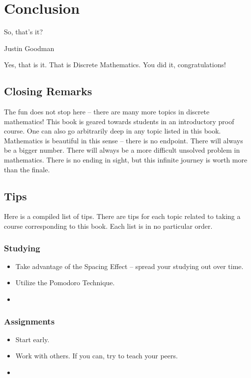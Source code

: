 \documentclass[main.tex]{subfiles}
\begin{document}
\chapter{Conclusion}

\epigraph{So, that's it?}{Justin Goodman}

Yes, that is it. That is Discrete Mathematics. You did it, congratulations!

\section{Closing Remarks}

The fun does not stop here -- there are many more topics in discrete mathematics! This book is geared towards students in an introductory proof course. One can also go arbitrarily deep in any topic listed in this book. Mathematics is beautiful in this sense -- there is no endpoint. There will always be a bigger number. There will always be a more difficult unsolved problem in mathematics. There is no ending in sight, but this infinite journey is worth more than the finale.

\section{Tips}

Here is a compiled list of tips. There are tips for each topic related to taking a course corresponding to this book. Each list is in no particular order.

\subsection{Studying}

\begin{itemize} %
	\item Take advantage of the Spacing Effect -- spread your studying out over time.
	\item Utilize the Pomodoro Technique.
	\item %
\end{itemize}

\subsection{Assignments}

\begin{itemize} %
	\item Start early.
	\item Work with others. If you can, try to teach your peers.
	\item %
\end{itemize}
\end{document}
